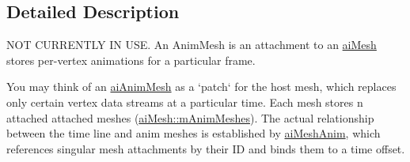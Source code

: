 \subsection{\-Detailed \-Description}
\-N\-O\-T \-C\-U\-R\-R\-E\-N\-T\-L\-Y \-I\-N \-U\-S\-E. \-An \-Anim\-Mesh is an attachment to an \hyperlink{structaiMesh}{ai\-Mesh} stores per-\/vertex animations for a particular frame. 

\-You may think of an \hyperlink{structaiAnimMesh}{ai\-Anim\-Mesh} as a `patch` for the host mesh, which replaces only certain vertex data streams at a particular time. \-Each mesh stores n attached attached meshes (\hyperlink{structaiMesh_a5078f7db7e99ed05db89dfa412f0e990}{ai\-Mesh\-::m\-Anim\-Meshes}). \-The actual relationship between the time line and anim meshes is established by \hyperlink{structaiMeshAnim}{ai\-Mesh\-Anim}, which references singular mesh attachments by their \-I\-D and binds them to a time offset. 

